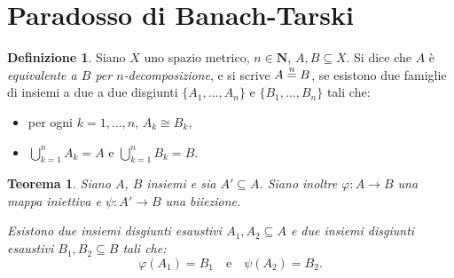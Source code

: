 \documentclass[a4paper,oneside,11pt]{book}
\theoremstyle{definition} \newtheorem{Def}{Definizione}
\theoremstyle{plain} \newtheorem{teo}{Teorema}
\theoremstyle{plain} \newtheorem{cor}[teo]{Corollario}
\theoremstyle{definition} \newtheorem{lem}[teo]{Lemma}
\theoremstyle{plain} \newtheorem{pro}[teo]{Proposizione}
\newcommand{\eqn}[1]{\stackrel{\text{\textit{#1}}}{=}}
\begin{document}
\section{Paradosso di Banach-Tarski}
	
	\begin{Def}
		Siano $X$ uno spazio metrico, $n \in \mathbf{N}$, $A,B \subseteq X$. Si dice che $A$ è \emph{equivalente a $B$ per $n$-decomposizione}, e si scrive $A \eqn{n} B$, se esistono due famiglie di insiemi a due a due disgiunti $\{A_1, \dots, A_n\}$ e $\{B_1, \dots, B_n\}$ tali che:
		\begin{itemize}
			\item per ogni $k = 1, \dots, n$, $A_k \cong B_k$,
			\item $\bigcup\limits_{k=1}^n A_k = A$ e $\bigcup\limits_{k=1}^n B_k = B$.
		\end{itemize}
	\end{Def}
	
	\begin{teo}\label{teobttb}\emph{\cite{ban24}}
		Siano $A$, $B$ insiemi e sia $A' \subseteq A$. Siano inoltre $\varphi: A \to B$ una mappa iniettiva e $\psi:A' \to B$ una biiezione.
		
		Esistono due insiemi disgiunti esaustivi $A_1, A_2 \subseteq A$ e due insiemi disgiunti esaustivi $B_1, B_2 \subseteq B$ tali che:
		\begin{equation*}
			\varphi(A_1) = B_1 \quad \text{e} \quad \psi(A_2) = B_2 \text{.}
		\end{equation*}
	\end{teo}
	
\end{document}
